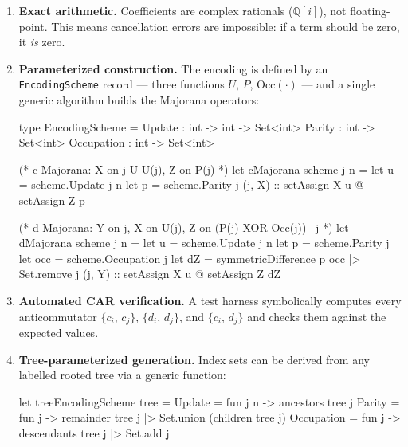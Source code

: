 \documentclass[11pt,a4paper]{article}
\newcommand{\acomm}[2]{\{#1,\,#2\}}
\newcommand{\Occ}[1]{\mathrm{Occ}(#1)}
\theoremstyle{definition}
\begin{document}
\begin{enumerate}
  \item \textbf{Exact arithmetic.}  Coefficients are complex rationals
    ($\mathbb{Q}[i]$), not floating-point.  This means cancellation errors
    are impossible: if a term should be zero, it \emph{is} zero.

  \item \textbf{Parameterized construction.}  The encoding is defined
    by an \texttt{EncodingScheme} record --- three functions
    $U$, $P$, $\Occ{\cdot}$ --- and a single generic algorithm builds
    the Majorana operators:

\begin{fsharpcode}
type EncodingScheme =
  { Update     : int -> int -> Set<int>
    Parity     : int -> Set<int>
    Occupation : int -> Set<int> }

(* c Majorana: X on {j} U U(j), Z on P(j) *)
let cMajorana scheme j n =
  let u = scheme.Update j n
  let p = scheme.Parity j
  (j, X) :: setAssign X u @ setAssign Z p

(* d Majorana: Y on j, X on U(j),
   Z on (P(j) XOR Occ(j)) \ {j} *)
let dMajorana scheme j n =
  let u   = scheme.Update j n
  let p   = scheme.Parity j
  let occ = scheme.Occupation j
  let dZ  = symmetricDifference p occ |> Set.remove j
  (j, Y) :: setAssign X u @ setAssign Z dZ
\end{fsharpcode}

  \item \textbf{Automated CAR verification.}  A test harness
    symbolically computes every anticommutator
    $\acomm{c_i}{c_j}$, $\acomm{d_i}{d_j}$, and
    $\acomm{c_i}{d_j}$ and checks them against the expected values.

  \item \textbf{Tree-parameterized generation.}  Index sets can be
    derived from any labelled rooted tree via a generic function:

\begin{fsharpcode}
let treeEncodingScheme tree =
  { Update     = fun j n -> ancestors tree j
    Parity     = fun j   -> remainder tree j
                             |> Set.union (children tree j)
    Occupation = fun j   -> descendants tree j
                             |> Set.add j }
\end{fsharpcode}
\end{enumerate}

\end{document}
